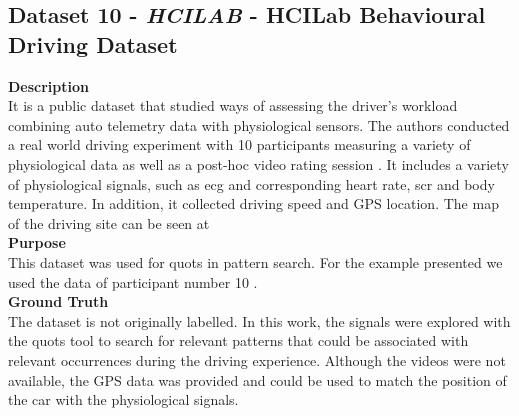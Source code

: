 \subsection{Dataset 10 - \textit{HCILAB} - HCILab Behavioural Driving Dataset}
\label{dat:dataset11}
\textbf{Description}\hfill\\
It is a public dataset that studied ways of assessing the driver's workload combining auto telemetry data with physiological sensors. The authors conducted a real world driving experiment with 10 participants measuring a variety of physiological data as well as a post-hoc video rating session \cite{hcilab}. It includes a variety of physiological signals, such as \gls{ecg} and corresponding heart rate, \gls{scr} and body temperature. In addition, it collected driving speed and GPS location. The map of the driving site can be seen at \cite{hcilab}\\
\textbf{Purpose}\hfill \\
This dataset was used for \gls{quots} in pattern search. For the example presented we used the data of participant number 10 \cite{hcilab}.\\
\textbf{Ground Truth}\hfill \\
The dataset is not originally labelled. In this work, the signals were explored with the \gls{quots} tool to search for relevant patterns that could be associated with relevant occurrences during the driving experience. Although the videos were not available, the GPS data was provided and could be used to match the position of the car with the physiological signals.

